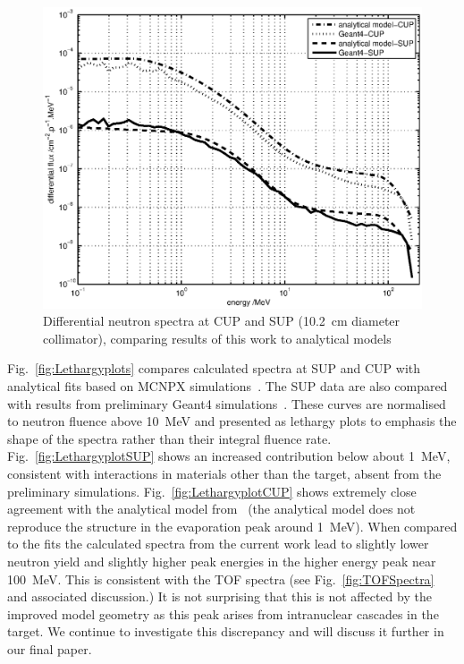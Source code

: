 \documentclass[peerreviewca,11pt,a4paper]{IEEEtran}
\let\MYoriglatexcaption\caption
\renewcommand{\caption}[2][\relax]{\MYoriglatexcaption[#2]{#2}}
\begin{document}
\begin{figure}[!t]
    \centering
    \includegraphics[width=0.8\columnwidth]{DiffYieldComparedSUPCUP10.eps}
    \caption{
        Differential neutron spectra at CUP and SUP (\SI{10.2}{\cm} diameter collimator), comparing results of this work to analytical models~\cite{Prokofiev2009,Prokofiev2014}
    }
    \label{fig:DifferentialSpectra}
\end{figure}

Fig.~\ref{fig:Lethargyplots} compares calculated spectra at SUP and CUP with analytical fits based on MCNPX simulations~\cite{Prokofiev2009,Prokofiev2014}.
The SUP data are also compared with results from preliminary Geant4 simulations~\cite{Platt2013}.
These curves are normalised to neutron fluence above \SI{10}{\MeV} and presented as lethargy plots to emphasis the shape of the spectra rather than their integral fluence rate.
Fig.~\ref{fig:LethargyplotSUP} shows an increased contribution below about \SI{1}{\MeV}, consistent with interactions in materials other than the target, absent from the preliminary simulations.
Fig.~\ref{fig:LethargyplotCUP} shows extremely close agreement with the analytical model from~\cite{Prokofiev2014} (the analytical model does not reproduce the structure in the evaporation peak around \SI{1}{\MeV}).
When compared to the fits the calculated spectra from the current work lead to slightly lower neutron yield and slightly higher peak energies in the higher energy peak near \SI{100}{\MeV}.
This is consistent with the TOF spectra (see Fig.~\ref{fig:TOFSpectra} and associated discussion.)
It is not surprising that this is not affected by the improved model geometry as this peak arises from intranuclear cascades in the target.
We continue to investigate this discrepancy and will discuss it further in our final paper.
\end{document}
